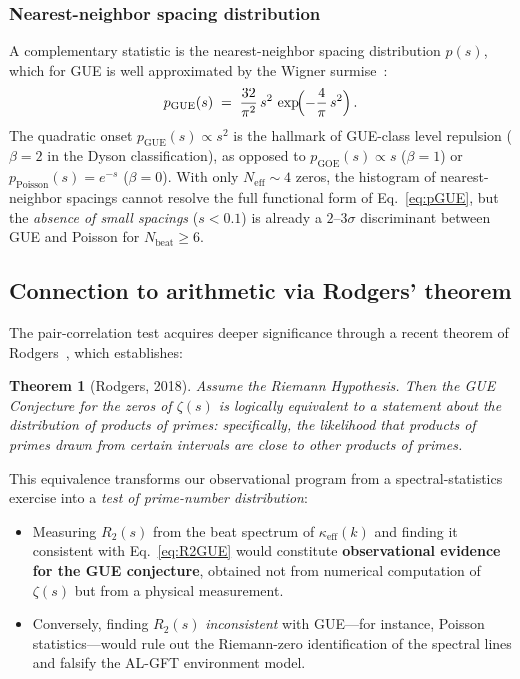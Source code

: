 \documentclass[12pt,a4paper]{article}
\newtheorem{theorem}{Theorem}
\begin{document}
\subsubsection{Nearest-neighbor spacing distribution}

A complementary statistic is the nearest-neighbor spacing
distribution $p(s)$, which for GUE is well approximated by
the Wigner surmise~\cite{Mehta2004}:
\begin{equation}\label{eq:pGUE}
  p_{\mathrm{GUE}}(s)
  \;=\;
  \frac{32}{\pi^2}\,s^2\,
  \exp\!\Bigl(-\frac{4}{\pi}\,s^2\Bigr)\,.
\end{equation}
The quadratic onset $p_{\mathrm{GUE}}(s)\propto s^2$ is the
hallmark of GUE-class level repulsion
($\beta=2$ in the Dyson classification), as opposed to
$p_{\mathrm{GOE}}(s)\propto s$ ($\beta=1$) or
$p_{\mathrm{Poisson}}(s)=e^{-s}$ ($\beta=0$).
With only $N_{\mathrm{eff}}\sim 4$ zeros, the histogram
of nearest-neighbor spacings cannot resolve the full
functional form of Eq.~\eqref{eq:pGUE}, but the
\emph{absence of small spacings} ($s<0.1$) is already
a $2$--$3\sigma$ discriminant between GUE and Poisson
for $N_{\mathrm{beat}}\ge 6$.


\subsection{Connection to arithmetic via Rodgers' theorem}
\label{sec:rodgers}

The pair-correlation test acquires deeper significance
through a recent theorem of Rodgers~\cite{Rodgers2018},
which establishes:

\begin{theorem}[Rodgers, 2018]
Assume the Riemann Hypothesis.  Then the GUE Conjecture
for the zeros of $\zeta(s)$ is logically equivalent to
a statement about the distribution of products of primes:
specifically, the likelihood that products of primes
drawn from certain intervals are close to other products
of primes.
\end{theorem}

\noindent
This equivalence transforms our observational program
from a spectral-statistics exercise into a
\emph{test of prime-number distribution}:
\begin{itemize}
\item Measuring $R_2(s)$ from the beat spectrum
  of $\kappa_{\mathrm{eff}}(k)$ and finding it consistent
  with Eq.~\eqref{eq:R2GUE} would constitute
  \textbf{observational evidence for the GUE conjecture},
  obtained not from numerical computation of $\zeta(s)$
  but from a physical measurement.

\item Conversely, finding $R_2(s)$
  \emph{inconsistent} with GUE---for instance,
  Poisson statistics---would rule out the
  Riemann-zero identification of the spectral lines
  and falsify the AL-GFT environment model.
\end{itemize}
\end{document}

